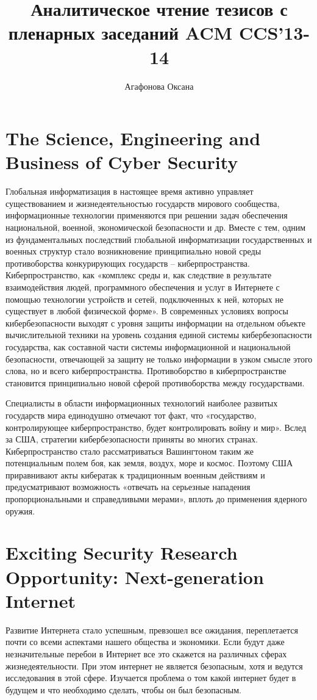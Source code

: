 \documentclass[10pt,a4paper]{article}
\author{Агафонова Оксана}
\title{Аналитическое чтение тезисов с пленарных заседаний ACM CCS'13-14}
\begin{document}
\maketitle
\clearpage
\tableofcontents
\clearpage
\section{The Science, Engineering and Business of Cyber Security}
\hspace{0,6cm} Глобальная информатизация в настоящее время активно управляет существованием и жизнедеятельностью государств мирового сообщества, информационные технологии применяются при решении задач обеспечения национальной, военной, экономической безопасности и др. Вместе с тем, одним из фундаментальных последствий глобальной информатизации государственных и военных структур стало возникновение принципиально новой среды противоборства конкурирующих государств – киберпространства. Киберпространство, как «комплекс среды и, как следствие в результате взаимодействия людей, программного обеспечения и услуг в Интернете с помощью технологии устройств и сетей, подключенных к ней, которых не существует в любой физической форме». В современных условиях вопросы кибербезопасности выходят с уровня защиты информации на отдельном объекте вычислительной техники на уровень создания единой системы кибербезопасности государства, как составной части системы информационной и национальной безопасности, отвечающей за защиту не только информации в узком смысле этого слова, но и всего киберпространства.  Противоборство в киберпространстве становится принципиально новой сферой противоборства между государствами. 

Специалисты в области информационных технологий наиболее развитых государств мира единодушно отмечают тот факт, что «государство, контролирующее киберпространство, будет контролировать войну и мир». Вслед за США, стратегии кибербезопасности приняты во многих странах. Киберпространство стало рассматриваться Вашингтоном таким же потенциальным полем боя, как земля, воздух, море и космос. Поэтому США приравнивают акты кибератак к традиционным военным действиям и предусматривают возможность «отвечать на серьезные нападения пропорциональными и справедливыми мерами», вплоть до применения ядерного  оружия.

\section{Exciting Security Research Opportunity: Next-generation Internet}
\hspace{0,6cm}Развитие Интернета стало успешным, превзошел все ожидания, переплетается почти со всеми  аспектами нашего общества и экономики.  Если будут даже незначительные перебои в Интернет все это скажется на различных сферах жизнедеятельности. При этом интернет не является безопасным, хотя и ведутся исследования в этой сфере. Изучается проблема о том какой интернет будет в будущем и что необходимо сделать, чтобы он был безопасным.
\end{document}
